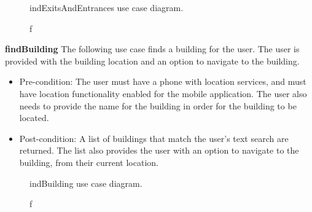 \documentclass[12pt,a4paper]{article}
\begin{document}
			\begin{figure}[h!]
				\caption findExitsAndEntrances use case diagram.
			\end{figure}
			
			\textbf{findBuilding}
			The following use case finds a building for the user. The user is provided with the building location and an 					option to navigate to the building.
			
			\begin{itemize}
			\item Pre-condition: The user must have a phone with location services, and must have location functionality 						  enabled for the mobile application. The user also needs to provide the name for the building in order for 					  the building to be located.
			\item Post-condition: A list of buildings that match the user's text search are returned. The list also provides   				  the user with an option to navigate to the building, from their current location.
			\end{itemize}
			
			\begin{figure}[h!]
				\caption findBuilding use case diagram.
			\end{figure}
			
\end{document}
